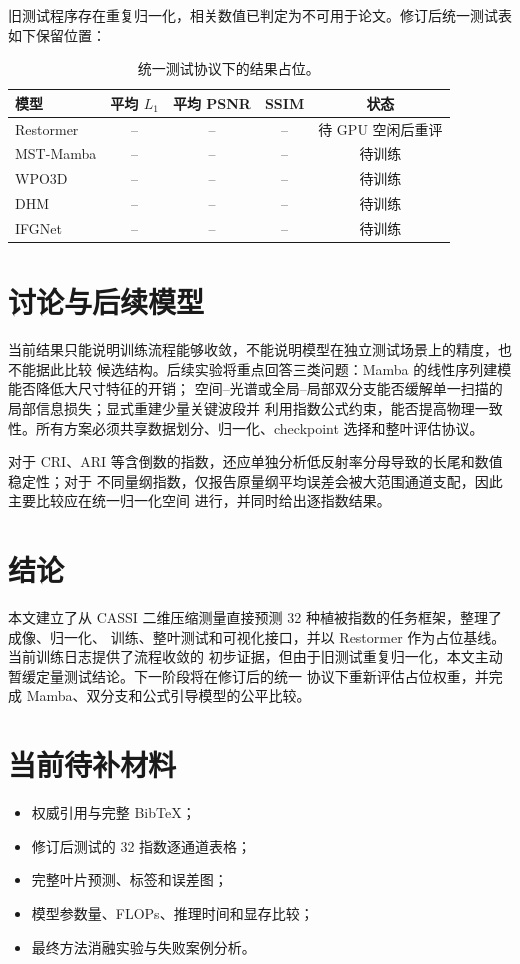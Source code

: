 \documentclass[UTF8,12pt,a4paper]{ctexart}
\begin{document}
旧测试程序存在重复归一化，相关数值已判定为不可用于论文。修订后统一测试表如下保留位置：
\begin{table}[htbp]
  \centering
  \caption{统一测试协议下的结果占位。}
  \begin{tabular}{lcccc}
    \toprule
    模型 & 平均 $L_1$ & 平均 PSNR & SSIM & 状态 \\
    \midrule
    Restormer & -- & -- & -- & 待 GPU 空闲后重评 \\
    MST-Mamba & -- & -- & -- & 待训练 \\
    WPO3D & -- & -- & -- & 待训练 \\
    DHM & -- & -- & -- & 待训练 \\
    IFGNet & -- & -- & -- & 待训练 \\
    \bottomrule
  \end{tabular}
\end{table}

\section{讨论与后续模型}
当前结果只能说明训练流程能够收敛，不能说明模型在独立测试场景上的精度，也不能据此比较
候选结构。后续实验将重点回答三类问题：Mamba 的线性序列建模能否降低大尺寸特征的开销；
空间--光谱或全局--局部双分支能否缓解单一扫描的局部信息损失；显式重建少量关键波段并
利用指数公式约束，能否提高物理一致性。所有方案必须共享数据划分、归一化、checkpoint
选择和整叶评估协议。

对于 CRI、ARI 等含倒数的指数，还应单独分析低反射率分母导致的长尾和数值稳定性；对于
不同量纲指数，仅报告原量纲平均误差会被大范围通道支配，因此主要比较应在统一归一化空间
进行，并同时给出逐指数结果。

\section{结论}
本文建立了从 CASSI 二维压缩测量直接预测 32 种植被指数的任务框架，整理了成像、归一化、
训练、整叶测试和可视化接口，并以 Restormer 作为占位基线。当前训练日志提供了流程收敛的
初步证据，但由于旧测试重复归一化，本文主动暂缓定量测试结论。下一阶段将在修订后的统一
协议下重新评估占位权重，并完成 Mamba、双分支和公式引导模型的公平比较。

\appendix
\section{当前待补材料}
\begin{itemize}
  \item 权威引用与完整 BibTeX；
  \item 修订后测试的 32 指数逐通道表格；
  \item 完整叶片预测、标签和误差图；
  \item 模型参数量、FLOPs、推理时间和显存比较；
  \item 最终方法消融实验与失败案例分析。
\end{itemize}
\end{document}
